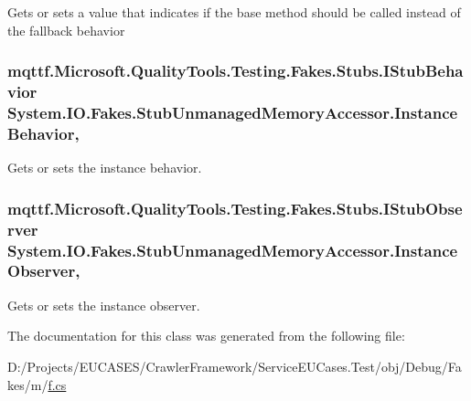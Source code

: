 Gets or sets a value that indicates if the base method should be called instead of the fallback behavior

\hypertarget{class_system_1_1_i_o_1_1_fakes_1_1_stub_unmanaged_memory_accessor_a0b4671256a8da3abe425db05e8dc09bb}{
\subsubsection[{Instance\-Behavior}]{\setlength{\rightskip}{0pt plus 5cm}mqttf.\-Microsoft.\-Quality\-Tools.\-Testing.\-Fakes.\-Stubs.\-I\-Stub\-Behavior System.\-I\-O.\-Fakes.\-Stub\-Unmanaged\-Memory\-Accessor.\-Instance\-Behavior\hspace{0.3cm}{\ttfamily [get]}, {\ttfamily [set]}}}\label{class_system_1_1_i_o_1_1_fakes_1_1_stub_unmanaged_memory_accessor_a0b4671256a8da3abe425db05e8dc09bb}


Gets or sets the instance behavior.

\hypertarget{class_system_1_1_i_o_1_1_fakes_1_1_stub_unmanaged_memory_accessor_a409fdcafc3ce0c888f35d219346494b6}{
\subsubsection[{Instance\-Observer}]{\setlength{\rightskip}{0pt plus 5cm}mqttf.\-Microsoft.\-Quality\-Tools.\-Testing.\-Fakes.\-Stubs.\-I\-Stub\-Observer System.\-I\-O.\-Fakes.\-Stub\-Unmanaged\-Memory\-Accessor.\-Instance\-Observer\hspace{0.3cm}{\ttfamily [get]}, {\ttfamily [set]}}}\label{class_system_1_1_i_o_1_1_fakes_1_1_stub_unmanaged_memory_accessor_a409fdcafc3ce0c888f35d219346494b6}


Gets or sets the instance observer.



The documentation for this class was generated from the following file\-:\begin{DoxyCompactItemize}
\item 
D\-:/\-Projects/\-E\-U\-C\-A\-S\-E\-S/\-Crawler\-Framework/\-Service\-E\-U\-Cases.\-Test/obj/\-Debug/\-Fakes/m/\hyperlink{m_2f_8cs}{f.\-cs}\end{DoxyCompactItemize}
